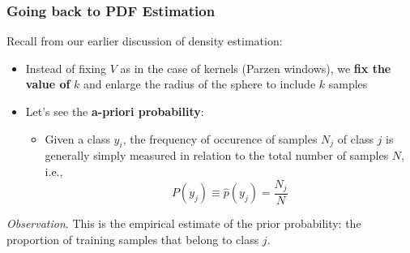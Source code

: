 \documentclass[a4paper]{article}
\theoremstyle{definition}
\begin{document}
\subsubsection{Going back to PDF Estimation}
Recall from our earlier discussion of density estimation:
\begin{itemize}
    \item Instead of fixing \( V \) as in the case of kernels (Parzen windows), we \textbf{fix the value of} \( k \) and enlarge the radius of the sphere to include \( k \) samples 
    \item Let's see the \textbf{a-priori probability}:
    \begin{itemize}
        \item Given a class \( y_i \), the frequency of occurence of samples \( N_j \) of class \( j \) is generally simply measured in relation to the total number of samples \( N \), i.e.,
        \[
          P(y_j) \equiv \hat{p}(y_j) = \frac{N_j}{N}
        \]
    \end{itemize}
\end{itemize}
\textit{Observation}. This is the empirical estimate of the prior probability: the proportion of training samples that belong to class \( j \).
\end{document}
